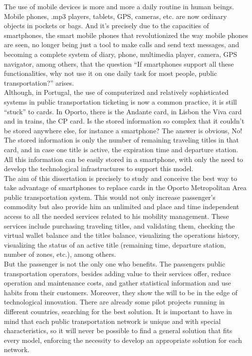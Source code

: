 The use of mobile devices is more and more a daily routine in human beings. Mobile phones, .mp3 players, tablets, GPS, cameras, etc. are now ordinary objects in pockets or bags. And it's precisely due to the capacities of smartphones, the smart mobile phones that revolutionized the way mobile phones are seen, no longer being just a tool to make calls and send text messages, and becoming a complete system of diary, phone, multimedia player, camera, GPS navigator, among others, that the question “If smartphones support all these functionalities, why not use it on one daily task for most people, public transportation?” arises.
\\Although, in Portugal, the use of computerized and relatively sophisticated systems in public transportation ticketing is now a common practice, it is still “stuck” to cards. In Oporto, there is the Andante card, in Lisbon the Viva card and in trains, the CP card. Is the stored information so complex that it couldn’t be stored anywhere else, for instance a smartphone? The answer is obvious, No! The stored information is only the number of remaining traveling titles in that card, and in case one title is active, the expiration time and departure station. All this information can be easily stored in a smartphone, with only the need to develop the technological infrastructures to support this model.
\\The aim of this dissertation is precisely to study and conceive the best way to take advantage of smartphones to replace cards in the Oporto Metropolitan Area public transportation system. This would not only increase passenger’s commodity but also provide him an unlimited and place and time independent access to all the needed services related to his mobility management. These services include purchasing traveling titles, and validating them, checking the virtual wallet balance and the titles balance, visualizing the operations history, visualizing the status of an active title (remaining time, departure station, number of zones, etc.), among others.
\\But the passenger is not the only one who benefits. The passengers public transportation operators, besides adding value to their services offer, reduce operation and maintenance costs, and gather statistical information and use habits from their customers. Moreover, they show the will to be in the edge of technological innovation. There are already some pilot projects running in different countries, searching for the best solution. It is important to have in mind that each public transportation network is unique and with special characteristics, so it will never be possible to find a general solution that fits every model, enforcing the necessity to develop an appropriate solution for each network.
